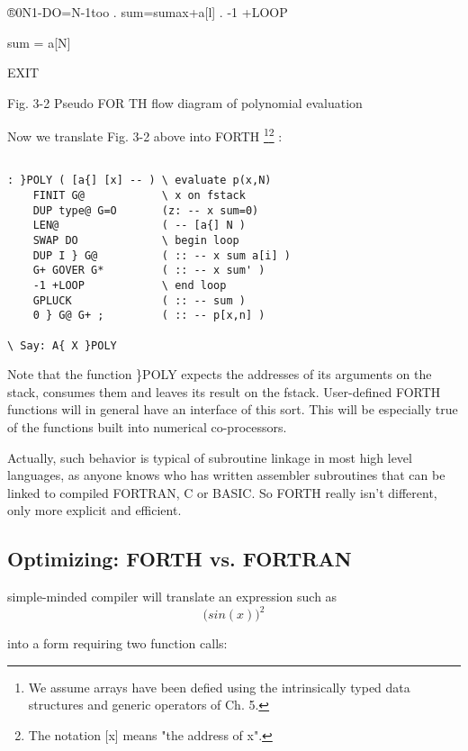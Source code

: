 ®0N1-DO\froml=N-1too .
sum=sumax+a[l]
. -1 +LOOP

sum = a[N]

 

EXIT

 

 

 

 

Fig. 3-2 Pseudo FOR TH flow diagram of polynomial evaluation

Now we translate Fig. 3-2 above into FORTH \footnote{We assume arrays have been defied using the intrinsically typed data structures and generic operators of Ch. 5.}\footnote{The notation [x] means "the address of x".} :

\begin{verbatim}

: }POLY ( [a{] [x] -- ) \ evaluate p(x,N)
    FINIT G@            \ x on fstack
    DUP type@ G=O       (z: -- x sum=0)
    LEN@                ( -- [a{] N )
    SWAP DO             \ begin loop
    DUP I } G@          ( :: -- x sum a[i] )
    G+ GOVER G*         ( :: -- x sum' )
    -1 +LOOP            \ end loop
    GPLUCK              ( :: -- sum )
    0 } G@ G+ ;         ( :: -- p[x,n] )

\ Say: A{ X }POLY

\end{verbatim}

Note that the function \}POLY expects the addresses of its arguments on the
stack, consumes them and leaves its result on the
fstack. User-defined FORTH functions will in general have an
interface of this sort. This will be especially true of the functions
built into numerical co-processors.

Actually, such behavior is typical of subroutine linkage in most high
level languages, as anyone knows who has written assembler subroutines that can
be linked to compiled FORTRAN, C or BASIC.
So FORTH really isn't different, only more explicit and efficient.

\subsection{Optimizing: FORTH vs. FORTRAN}
 simple-minded compiler will translate an expression such as
\begin{equation}
     \Big( sin(x) \Big)^2
\end{equation}

into a form requiring two function calls:

